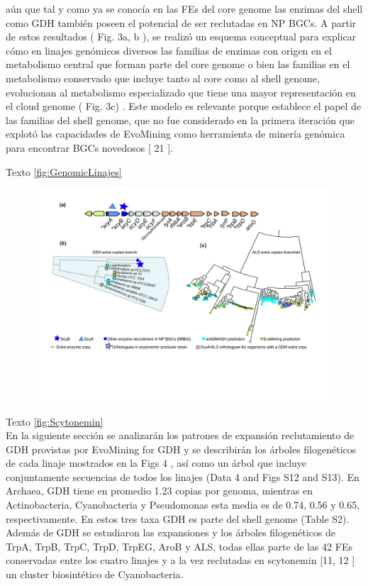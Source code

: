 \documentclass[12pt,twoside]{reedthesis}
\begin{document}
  aún que tal y como ya se conocía en las FEs del core genome las enzimas
  del shell como GDH también poseen el potencial de ser reclutadas en NP
  BGCs. A partir de estos resultados ( Fig. 3a, b ), se realizó un esquema
  conceptual para explicar cómo en linajes genómicos diversos las familias
  de enzimas con origen en el metabolismo central que forman parte del
  core genome o bien las familias en el metabolismo conservado que incluye
  tanto al core como al shell genome, evolucionan al metabolismo
  especializado que tiene una mayor representación en el cloud genome (
  Fig. 3c) . Este modelo es relevante porque establece el papel de las
  familias del shell genome, que no fue considerado en la primera
  iteración que explotó las capacidades de EvoMining como herramienta de
  minería genómica para encontrar BGCs novedosos {[} 21 {]}.
  
  Texto \autoref{fig:GenomicLinajes}
  
  \begin{figure}[h!tbp]
  \centering
  \includegraphics[angle = 0,scale = .5]{chapter2/FigurasPaper/Figure5.pdf}
  \caption[EvoMining aplicado a la rama de scytonemina]{\footnotesize{}}
  \label{fig:Scytonemin}
  \end{figure}
  
  Texto \autoref{fig:Scytonemin}\\
  En la siguiente sección se analizarán los patrones de expansión
  reclutamiento de GDH provistas por EvoMining for GDH y se describirán
  los árboles filogenéticos de cada linaje mostrados en la Figs 4 , así
  como un árbol que incluye conjuntamente secuencias de todos los linajes
  (Data 4 and Figs S12 and S13). En Archaea, GDH tiene en promedio 1.23
  copias por genoma, mientras en Actinobacteria, Cyanobacteria y
  Pseudomonas esta media es de 0.74, 0.56 y 0.65, respectivamente. En
  estos tres taxa GDH es parte del shell genome (Table S2). Además de GDH
  se estudiaron las expansiones y los árboles filogenéticos de TrpA, TrpB,
  TrpC, TrpD, TrpEG, AroB y ALS, todas ellas parte de las 42 FEs
  conservadas entre los cuatro linajes y a la vez reclutadas en scytonemin
  {[}11, 12 {]} un cluster biosintético de Cyanobacteria.
  
\end{document}
